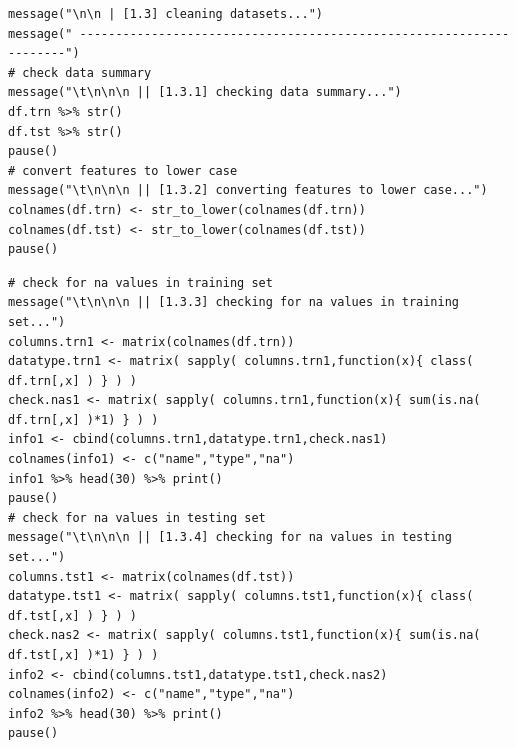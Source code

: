 \documentclass[10pt, twoside]{article}
\begin{document}
\begin{verbatim}
message("\n\n | [1.3] cleaning datasets...")
message(" --------------------------------------------------------------------")
# check data summary
message("\t\n\n\n || [1.3.1] checking data summary...")
df.trn %>% str()
df.tst %>% str()
pause()
# convert features to lower case
message("\t\n\n\n || [1.3.2] converting features to lower case...")
colnames(df.trn) <- str_to_lower(colnames(df.trn))
colnames(df.tst) <- str_to_lower(colnames(df.tst))
pause()
\end{verbatim}

\begin{verbatim}
# check for na values in training set
message("\t\n\n\n || [1.3.3] checking for na values in training set...")
columns.trn1 <- matrix(colnames(df.trn))
datatype.trn1 <- matrix( sapply( columns.trn1,function(x){ class( df.trn[,x] ) } ) )
check.nas1 <- matrix( sapply( columns.trn1,function(x){ sum(is.na( df.trn[,x] )*1) } ) )
info1 <- cbind(columns.trn1,datatype.trn1,check.nas1)
colnames(info1) <- c("name","type","na")
info1 %>% head(30) %>% print()
pause()
# check for na values in testing set
message("\t\n\n\n || [1.3.4] checking for na values in testing set...")
columns.tst1 <- matrix(colnames(df.tst))
datatype.tst1 <- matrix( sapply( columns.tst1,function(x){ class( df.tst[,x] ) } ) )
check.nas2 <- matrix( sapply( columns.tst1,function(x){ sum(is.na( df.tst[,x] )*1) } ) )
info2 <- cbind(columns.tst1,datatype.tst1,check.nas2)
colnames(info2) <- c("name","type","na")
info2 %>% head(30) %>% print()
pause()
\end{verbatim}
\end{document}
